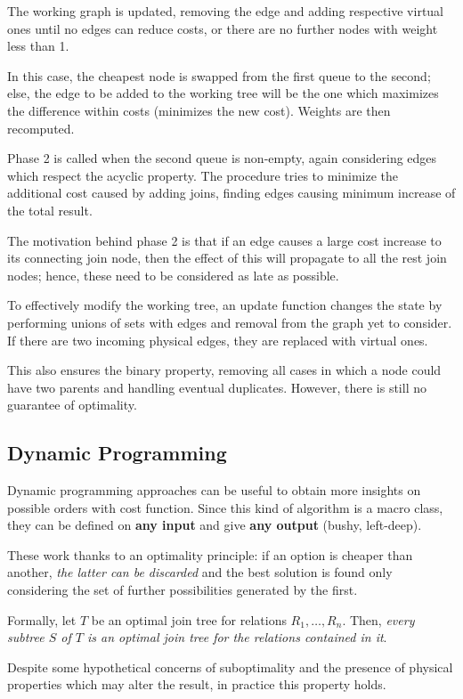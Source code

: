 The working graph is updated, removing the edge and adding respective virtual ones until no edges can reduce costs, or there are no further nodes with weight less than 1.

In this case, the cheapest node is swapped from the first queue to the second; else, the edge to be added to the working tree will be the one which maximizes the difference within costs (minimizes the new cost). Weights are then recomputed. 

Phase 2 is called when the second queue is non-empty, again considering edges which respect the acyclic property. The procedure tries to minimize the additional cost caused by adding joins, finding edges causing minimum increase of the total result. 

The motivation behind phase 2 is that if an edge causes a large cost increase to its connecting join node, then the effect of this will propagate to all the rest join nodes; hence, these need to be considered as late as possible.

To effectively modify the working tree, an update function changes the state by performing unions of sets with edges and removal from the graph yet to consider. If there are two incoming physical edges, they are replaced with virtual ones. 

This also ensures the binary property, removing all cases in which a node could have two parents and handling eventual duplicates. However, there is still no guarantee of optimality. 

\subsection{Dynamic Programming}
Dynamic programming approaches can be useful to obtain more insights on possible orders with cost function. Since this kind of algorithm is a macro class, they can be defined on \textbf{any input} and give \textbf{any output} (bushy, left-deep).

These work thanks to an optimality principle: if an option is cheaper than another, \textit{the latter can be discarded} and the best solution is found only considering the set of further possibilities generated by the first.

Formally, let $T$ be an optimal join tree for relations $R_1, \dots, R_n$. Then, \textit{every subtree $S$ of $T$ is an optimal join tree for the relations contained in it}.

Despite some hypothetical concerns of suboptimality and the presence of physical properties which may alter the result, in practice this property holds.

